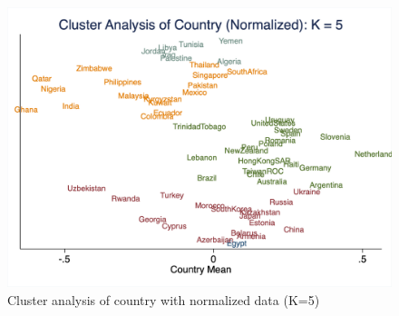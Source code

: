 \documentclass[10pt,leqno]{article}
\begin{document}
\begin{figure}  [h!]
\begin{center}
\caption{Cluster analysis of country with normalized data (K=5)}
\includegraphics[scale=0.25]{CA_CountryK5_NOR.png}
\end{center}
\end{figure}  
\end{document}
